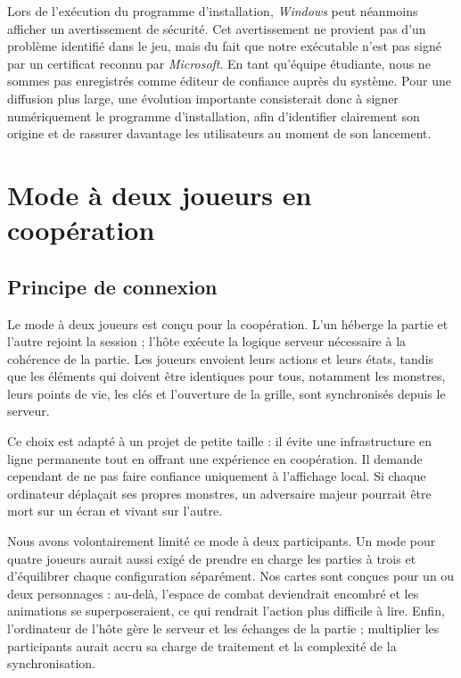 \documentclass[a4paper,12pt]{article}
\newcommand{\sectionbreak}{\clearpage}
\begin{document}
Lors de l'exécution du programme d'installation, \textit{Windows} peut néanmoins
afficher un avertissement de sécurité. Cet avertissement ne provient pas d'un problème
identifié dans le jeu, mais du fait que notre exécutable n'est pas signé par un
certificat reconnu par \textit{Microsoft}. En tant qu'équipe étudiante, nous ne sommes
pas enregistrés comme éditeur de confiance auprès du système. Pour une diffusion plus
large, une évolution importante consisterait donc à signer numériquement le programme
d'installation, afin d'identifier clairement son origine et de rassurer davantage les
utilisateurs au moment de son lancement.

\sectionbreak
\section{Mode à deux joueurs en coopération}

\subsection{Principe de connexion}

Le mode à deux joueurs est conçu pour la coopération. L'un héberge la partie et l'autre rejoint
la session ; l'hôte exécute la logique serveur nécessaire à la cohérence de la partie.
Les joueurs envoient leurs actions et leurs états, tandis que les éléments qui doivent
être identiques pour tous, notamment les monstres, leurs points de vie, les clés et
l'ouverture de la grille, sont synchronisés depuis le serveur.

Ce choix est adapté à un projet de petite taille : il évite une infrastructure en ligne
permanente tout en offrant une expérience en coopération. Il demande cependant de ne pas
faire confiance uniquement à l'affichage local. Si chaque ordinateur déplaçait ses
propres monstres, un adversaire majeur pourrait être mort sur un écran et vivant sur l'autre.

Nous avons volontairement limité ce mode à deux participants. Un mode pour quatre
joueurs aurait aussi exigé de prendre en charge les parties à trois et d'équilibrer
chaque configuration séparément. Nos cartes sont conçues pour un ou deux personnages :
au-delà, l'espace de combat deviendrait encombré et les animations se superposeraient,
ce qui rendrait l'action plus difficile à lire. Enfin, l'ordinateur de l'hôte gère le
serveur et les échanges de la partie ; multiplier les participants aurait accru sa
charge de traitement et la complexité de la synchronisation.
\end{document}
